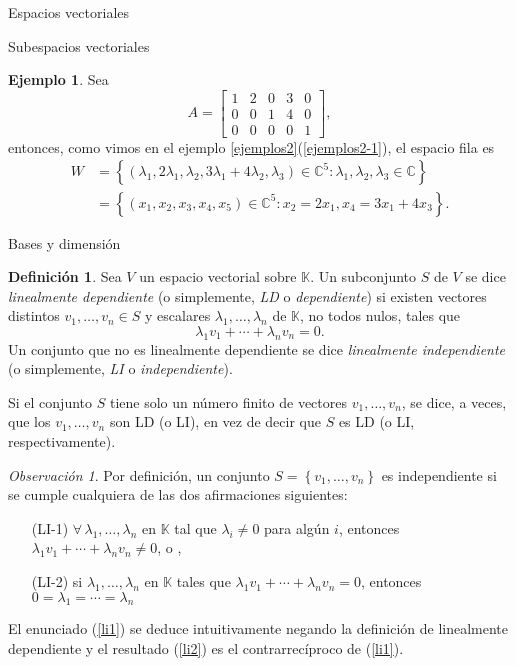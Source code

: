 \documentclass[a4paper,12pt,twoside,spanish,reqno]{amsbook}
\theoremstyle{definition}
\newtheorem{definicion}{Definici\'on}[section]
\newtheorem{ejemplo}{Ejemplo}[section]
\theoremstyle{remark}
\newtheorem{observacion}{Observaci\'on}[section]
\newcommand{\C}{\mathbb C}
\newcommand{\K}{\mathbb K}
\begin{document}
\begin{chapter}{Espacios vectoriales}
\begin{section}{Subespacios vectoriales}
    \begin{ejemplo}
        Sea
        $$
        A = \begin{bmatrix}
        1&2&0&3&0\\ 0&0&1&4&0 \\0&0&0&0&1
        \end{bmatrix},
        $$
        entonces, como vimos en el ejemplo \ref{ejemplos2}(\ref{ejemplos2-1}), el espacio fila es
        \begin{align*}
        W &= \left\{(\lambda_1,2\lambda_1,\lambda_2,3\lambda_1+4\lambda_2,\lambda_3)\in \C^5: \lambda_1,\lambda_2, \lambda_3 \in \C \right\} \\
        &=\left\{(x_1,x_2,x_3,x_4,x_5)\in \C^5: x_2 = 2x_1, x_4 = 3x_1+4x_3 \right\}.
        \end{align*}
    \end{ejemplo}
\end{section}		
        
\begin{section}{Bases y dimensión}
    \begin{definicion}
        Sea $V$ un espacio vectorial sobre $\K$. Un subconjunto $S$ de $V$ se dice \textit{linealmente dependiente} (o simplemente, \textit{LD} o \textit{dependiente}) si existen vectores distintos $v_1,\ldots,v_n \in S$  y escalares $\lambda_1,\ldots,\lambda_n$ de $\K$, no todos nulos, tales que 	
        \begin{equation*}
            \lambda_1v_1+\cdots+\lambda_nv_n=0.
        \end{equation*}
        Un conjunto que no es linealmente dependiente se dice \textit{linealmente independiente} (o simplemente, \textit{LI} o \textit{independiente}).
        
        Si el conjunto $S$ tiene solo un número finito de vectores $v_1,\ldots,v_n$, se dice,
        a veces, que los $v_1,\ldots,v_n$ son LD (o LI), en vez de decir
        que $S$ es LD (o LI, respectivamente).
        
    \end{definicion}

\begin{observacion} Por definición, un conjunto $S = \left\{v_1,\ldots,v_n \right\}$ es independiente si se cumple cualquiera de las dos afirmaciones siguientes:
    \begin{enumerate}
        \item[(LI-1)]\label{li1} $\forall\,\lambda_1,\ldots,\lambda_n$ en $\K$ tal que $\lambda_i \ne 0$ para algún $i$,  entonces  $\lambda_1v_1+\cdots+\lambda_nv_n\not=0$, o ,
        \item[(LI-2)] \label{li2} si $\lambda_1,\ldots,\lambda_n$ en $\K$ tales que $\lambda_1v_1+\cdots+\lambda_nv_n=0$,  entonces $0=\lambda_1=\cdots=\lambda_n$
    \end{enumerate}
    El enunciado (\ref{li1}) se deduce intuitivamente negando  la definición de linealmente dependiente y el resultado (\ref{li2}) es el contrarrecíproco  de (\ref{li1}).
    

\end{observacion}
\end{section}
\end{chapter}
\end{document}
